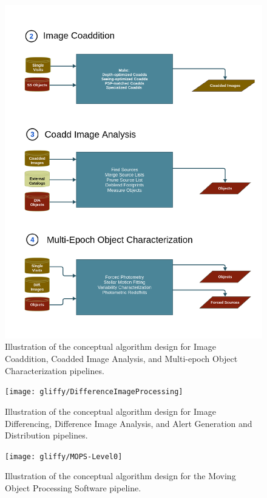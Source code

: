 \documentclass[SE,lsstdraft,toc]{lsstdoc}
\begin{document}
\begin{figure}[!th]
    \centering
    \vskip -0.2in
    \includegraphics[scale=0.535]{gliffy/CoaddedImageProcessing}
    \vskip -0.2in
    \caption{Illustration of the conceptual algorithm design for Image Coaddition, Coadded Image Analysis,
     and Multi-epoch Object Characterization pipelines.\label{fig:Pipes234}}
\end{figure}



\begin{figure}[!th]
    \centering
    \vskip -0.3in
    \texttt{[image: gliffy/DifferenceImageProcessing]}
    \vskip -0.1in
    \caption{Illustration of the conceptual algorithm  design for Image Differencing, Difference Image
                      Analysis, and Alert Generation and Distribution pipelines. \label{fig:Pipes567}}
\end{figure}

\begin{figure}[!t]
    \centering
    \vskip -2.3in
    \texttt{[image: gliffy/MOPS-Level0]}
    \vskip -0.1in
    \caption{Illustration of the conceptual algorithm design for the Moving Object Processing Software pipeline. \label{fig:Pipe8}}
\end{figure}
\end{document}
